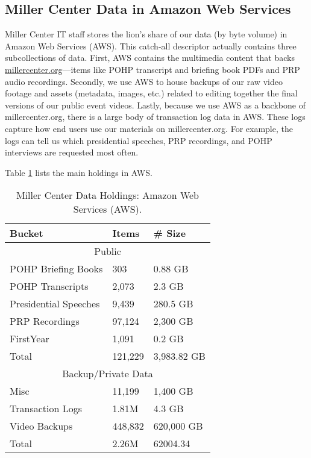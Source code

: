 \documentclass[12pt, oneside]{article}   	%
\begin{document}
\subsection{Miller Center Data in Amazon Web Services}\label{section.data.aws}
Miller Center IT staff stores the lion’s share of our data (by byte volume) in Amazon Web Services (AWS).  This catch-all descriptor actually contains three subcollections of data.  First, AWS contains the multimedia content that backs \href{https://millercenter.org}{millercenter.org}—items like POHP transcript and briefing book PDFs and PRP audio recordings.   Secondly, we use AWS to house backups of our raw video footage and assets (metadata, images, etc.) related to editing together the final versions of our public event videos.  Lastly, because we use AWS as a backbone of millercenter.org, there is a large body of transaction log data in AWS.  These logs capture how end users use our materials on millercenter.org.  For example, the logs can tell us which presidential speeches, PRP recordings, and POHP interviews are requested most often.

Table \ref{table.data.aws} lists the main holdings in AWS.  

\begin{table}[htp]
\caption{Miller Center Data Holdings: Amazon Web Services (AWS).}
\begin{center}
\begin{tabular}{l l l }
\toprule
Bucket				&	Items		&	\#  Size	\\
\midrule
						\multicolumn{3}{c}{Public}		\\
\midrule
 POHP Briefing Books	&	303			&	0.88 GB \\
 \midrule
 POHP Transcripts		&	2,073		&	2.3 GB	\\
 \midrule
 Presidential Speeches	&	9,439		&	280.5 GB  \\
 \midrule
 PRP Recordings		&	97,124		&	2,300 GB	\\
 \midrule
 FirstYear				&	1,091		&	0.2 GB	\\
 \bottomrule
  Total				&	121,229		&	3,983.82 GB 	\\
 \bottomrule
 						\multicolumn{3}{c}{Backup/Private Data}		\\
 \midrule
 Misc					&	11,199		&	1,400 GB	\\
\midrule
 Transaction Logs		&	1.81M		&	4.3 GB \\
\midrule
 Video Backups			&	448,832		&	620,000 GB \\
\bottomrule
 Total				&	2.26M		&	62004.34 	\\
\bottomrule

\end{tabular}
\end{center}
\label{table.data.aws}
\end{table}%
\end{document}

